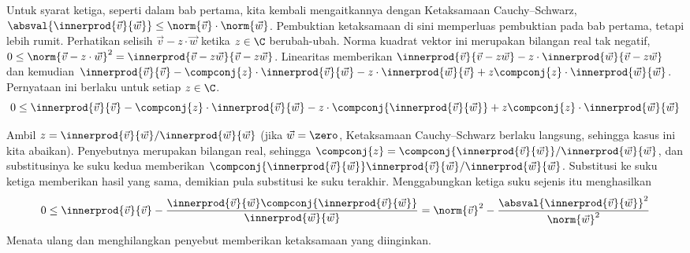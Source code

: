 Untuk syarat ketiga, seperti dalam bab pertama, kita kembali mengaitkannya
dengan Ketaksamaan Cauchy--Schwarz,
$\absval{\innerprod{\vec{v}}{\vec{w}}}\leq \norm{\vec{v}}\cdot\norm{\vec{w}}$.
Pembuktian ketaksamaan di sini memperluas pembuktian pada bab pertama,
tetapi lebih rumit.
Perhatikan selisih $\vec{v}-z\cdot\vec{w}$ ketika $z\in\C$ berubah-ubah.
Norma kuadrat vektor ini merupakan bilangan real tak negatif,
$0\leq \norm{\vec{v}-z\cdot\vec{w}}^2
   =\innerprod{\vec{v}-z\vec{w}}{\vec{v}-z\vec{w}}$.
Linearitas memberikan
$\innerprod{\vec{v}}{\vec{v}-z\vec{w}}
  -z\cdot\innerprod{\vec{w}}{\vec{v}-z\vec{w}}$
dan kemudian
$\innerprod{\vec{v}}{\vec{v}}
  -\compconj{z}\cdot\innerprod{\vec{v}}{\vec{w}}
  -z\cdot\innerprod{\vec{w}}{\vec{v}}
  +z\compconj{z}\cdot\innerprod{\vec{w}}{\vec{w}}$.
Pernyataan ini berlaku untuk setiap $z\in\C$.
\begin{equation*}
 0
  \leq\innerprod{\vec{v}}{\vec{v}}
  -\compconj{z}\cdot\innerprod{\vec{v}}{\vec{w}}
  -z\cdot\compconj{\innerprod{\vec{v}}{\vec{w}}}
  +z\compconj{z}\cdot\innerprod{\vec{w}}{\vec{w}}
\end{equation*}

Ambil
$z=\innerprod{\vec{v}}{\vec{w}}/\innerprod{\vec{w}}{\vec{w}}$
(jika $\vec{w}=\zero$, Ketaksamaan Cauchy--Schwarz berlaku langsung,
sehingga kasus ini kita abaikan).
Penyebutnya merupakan bilangan real, sehingga
$\compconj{z}=\compconj{\innerprod{\vec{v}}{\vec{w}}}/\innerprod{\vec{w}}{\vec{w}}$,
dan substitusinya ke suku kedua memberikan
$\compconj{\innerprod{\vec{v}}{\vec{w}}}\innerprod{\vec{v}}{\vec{w}}/\innerprod{\vec{w}}{\vec{w}}$.
Substitusi ke suku ketiga memberikan hasil yang sama, demikian pula
substitusi ke suku terakhir.
Menggabungkan ketiga suku sejenis itu menghasilkan
\begin{equation*}
 0
  \leq\innerprod{\vec{v}}{\vec{v}}
  -\frac{\innerprod{\vec{v}}{\vec{w}}\compconj{\innerprod{\vec{v}}{\vec{w}}}}{\innerprod{\vec{w}}{\vec{w}}}
  =\norm{\vec{v}}^2
  -\frac{\absval{\innerprod{\vec{v}}{\vec{w}}}^2}{\norm{\vec{w}}^2}
\end{equation*}
Menata ulang dan menghilangkan penyebut memberikan ketaksamaan yang diinginkan.

